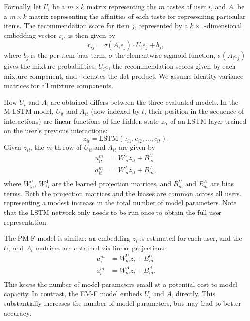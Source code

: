 \documentclass[sigconf]{acmart}
\begin{document}
Formally, let $U_i$ be a $m \times k$ matrix representing the $m$ tastes of user $i$, and $A_i$ be a $m \times k$ matrix representing the affinities of each taste for representing particular items. The recommendation score for item $j$, represented by a $k \times 1$-dimensional embedding vector $e_j$, is then given by
\begin{equation}
  r_{ij} = \sigma\left(A_ie_j\right) \cdot U_ie_j + b_j,
\end{equation}
where $b_j$ is the per-item bias term, $\sigma$ the elementwise sigmoid function, $\sigma\left(A_ie_j\right)$ gives the mixture probabilities, $U_ie_j$ the recommendation scores given by each mixture component, and $\cdot$ denotes the dot product. We assume identity variance matrices for all mixture components.

How $U_i$ and $A_i$ are obtained differs between the three evaluated models. In the M-LSTM model, $U_{it}$ and $A_{it}$ (now indexed by $t$, their position in the sequence of interactions) are linear functions of the hidden state $z_{it}$ of an LSTM layer trained on the user's previous interactions:
\begin{equation}
  \label{eq:lstm}
  z_{it} = \mathrm{LSTM}\left(e_{i1}, e_{i2}, \ldots, e_{it}\right).
\end{equation}
Given $z_{it}$, the $m$-th row of $U_{it}$ and $A_{it}$ are given by
\begin{equation}
\begin{aligned}
  u^m_{it} &= W^U_mz_{it} + B^U_m\\
  a^m_{it} &= W^A_mz_{it} + B^A_m,\\
\end{aligned}
\end{equation}
where $W^U_m$, $W^A_M$ are the learned projection matrices, and $B^U_m$ and $B^A_m$ are bias terms. Both the projection matrices and the biases are common across all users, representing a modest increase in the total number of model parameters. Note that the LSTM network only needs to be run once to obtain the full user representation.

The PM-F model is similar: an embedding $z_i$ is estimated for each user, and the $U_i$ and $A_i$ matrices are obtained via linear projections:
\begin{equation}
\begin{aligned}
  u^m_{i} &= W^U_mz_{i} + B^U_m\\
  a^m_{i} &= W^A_mz_{i} + B^A_m.\\
\end{aligned}
\end{equation}
This keeps the number of model parameters small at a potential cost to model capacity. In contrast, the EM-F model embeds $U_i$ and $A_i$ directly. This substantially increases the number of model parameters, but may lead to better accuracy.
\end{document}
